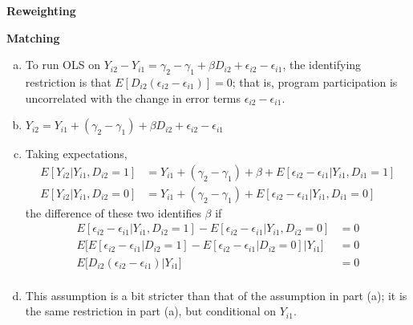 \documentclass[11pt]{article}
\begin{document}
\begin{center}
\end{center}

\bigskip \textbf{Reweighting}

\bigskip \textbf{Matching}

\begin{enumerate}[(a)]

	\item To run OLS on $Y_{i2} - Y_{i1} = \gamma_2 - \gamma_1 + \beta D_{i2} + \epsilon_{i2} - \epsilon_{i1}$, the identifying restriction is that $E\left[D_{i2} (\epsilon_{i2} - \epsilon_{i1})\right] = 0$; that is, program participation is uncorrelated with the change in error terms $\epsilon_{i2} - \epsilon_{i1}$.

	\item $Y_{i2} = Y_{i1} + (\gamma_2 - \gamma_1) + \beta D_{i2} + \epsilon_{i2} - \epsilon_{i1}$

	\item Taking expectations,
	\begin{align*}
		E\left[Y_{i2} | Y_{i1}, D_{i2} = 1\right] &= Y_{i1} + (\gamma_2 - \gamma_1) + \beta + E[\epsilon_{i2} - \epsilon_{i1} | Y_{i1}, D_{i1}=1]\\
		E\left[Y_{i2} | Y_{i1}, D_{i2} = 0\right] &= Y_{i1} + (\gamma_2 - \gamma_1) + E[\epsilon_{i2} - \epsilon_{i1} | Y_{i1}, D_{i1}=0]
	\end{align*}
	the difference of these two identifies $\beta$ if
	\begin{align*}
		E[\epsilon_{i2} - \epsilon_{i1} | Y_{i1}, D_{i2}=1] - E[\epsilon_{i2} - \epsilon_{i1} | Y_{i1}, D_{i2}=0] &= 0 \\
		E \bigg[ E[\epsilon_{i2} - \epsilon_{i1} | D_{i2}=1] - E[\epsilon_{i2} - \epsilon_{i1} | D_{i2}=0] \bigg| Y_{i1} \bigg]&= 0 \\
		E \bigg[ D_{i2} (\epsilon_{i2} - \epsilon_{i1}) \bigg| Y_{i1} \bigg]&= 0 \\
	\end{align*}
	
	\item This assumption is a bit stricter than that of the assumption in part (a); it is the same restriction in part (a), but conditional on $Y_{i1}$.

\end{enumerate}
\end{document}
